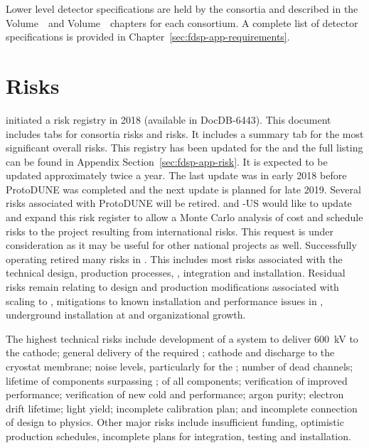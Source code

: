 Lower level detector specifications are held by the consortia and
described in the   
Volume~\volnumbersp\ and  Volume~\volnumberdp\ chapters for
each consortium. A complete list of detector specifications is
provided in Chapter~\ref{sec:fdsp-app-requirements}.

\section{Risks}
\label{sec:fdsp-coord-risks}


 initiated a risk registry in 2018 (available in
DocDB-6443). This document includes tabs for consortia risks and
 risks. It includes a summary tab for the most significant
overall  risks.  This registry has been updated for the
 and the full listing can be found in Appendix
Section~\ref{sec:fdsp-app-risk}. It is expected to be updated
approximately twice a year. The last update was in early 2018 before
ProtoDUNE was completed and the next update is planned for late
2019. Several risks associated with ProtoDUNE will
be retired.  and -US would like  to update and
expand this risk register to allow a Monte Carlo analysis of cost and
schedule risks to the  project resulting from international
 risks. This request is under consideration as it may be
useful for other national projects as well.
Successfully operating  retired many 
risks in . This includes most risks associated with the
technical design, production processes, , integration and
installation. Residual risks remain relating to design and production
modifications associated with scaling to , mitigations to
known installation and performance issues in ,
underground installation at \surf and organizational growth.

The highest technical risks include development of a system to
deliver \SI{600}{kV} to the \dual cathode; general delivery of the
required ; cathode and  discharge to the cryostat
membrane; noise levels, particularly for the ; %
number of dead channels; lifetime of components surpassing \dunelifetime{}; %
 of all components; verification of improved 
performance; verification of new cold   and   performance;
argon purity; electron drift lifetime; \phel light yield;
incomplete calibration plan; and incomplete connection of design to
physics. Other major risks include insufficient funding, optimistic
production schedules, incomplete plans for integration, testing and installation.

